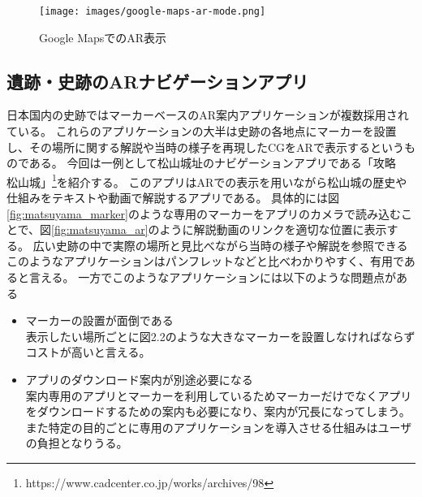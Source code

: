 \begin{figure}[h]
  \begin{center}
      \texttt{[image: images/google-maps-ar-mode.png]}
  \end{center}
  \caption{Google MapsでのAR表示} \label{fig:googleMapAr}
\end{figure}



\subsection{遺跡・史跡のARナビゲーションアプリ}
日本国内の史跡ではマーカーベースのAR案内アプリケーションが複数採用されている。
これらのアプリケーションの大半は史跡の各地点にマーカーを設置し、その場所に関する解説や当時の様子を再現したCGをARで表示するというものである。
今回は一例として松山城址のナビゲーションアプリである「攻略　松山城」\footnote{\textsf{https://www.cadcenter.co.jp/works/archives/98}}を紹介する。
このアプリはARでの表示を用いながら松山城の歴史や仕組みをテキストや動画で解説するアプリである。
具体的には図\ref{fig:matsuyama_marker}のような専用のマーカーをアプリのカメラで読み込むことで、図\ref{fig:matsuyama_ar}のように解説動画のリンクを適切な位置に表示する。
広い史跡の中で実際の場所と見比べながら当時の様子や解説を参照できるこのようなアプリケーションはパンフレットなどと比べわかりやすく、有用であると言える。
一方でこのようなアプリケーションには以下のような問題点がある

\begin{itemize}
  \item マーカーの設置が面倒である\\
    表示したい場所ごとに図2.2のような大きなマーカーを設置しなければならずコストが高いと言える。
  \item アプリのダウンロード案内が別途必要になる\\
    案内専用のアプリとマーカーを利用しているためマーカーだけでなくアプリをダウンロードするための案内も必要になり、案内が冗長になってしまう。
    また特定の目的ごとに専用のアプリケーションを導入させる仕組みはユーザの負担となりうる。
\end{itemize}


